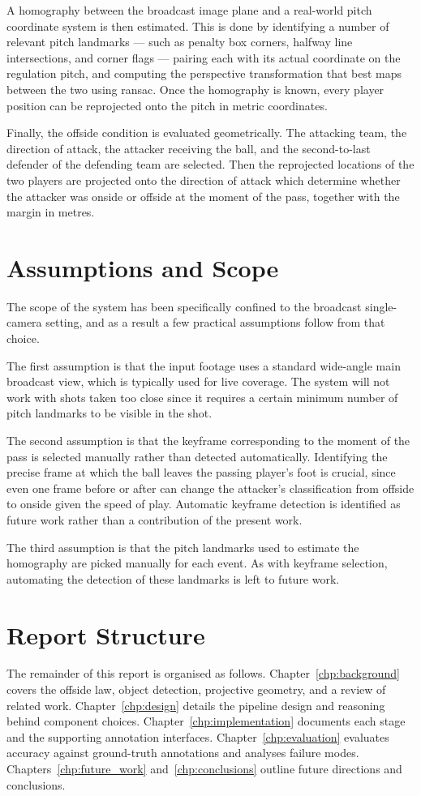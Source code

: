 A homography between the broadcast image plane and a real-world pitch coordinate system is then estimated. This is done by identifying a number of relevant pitch landmarks --- such as penalty box corners, halfway line intersections, and corner flags --- pairing each with its actual coordinate on the regulation pitch, and computing the perspective transformation that best maps between the two using \gls{ransac}. Once the homography is known, every player position can be reprojected onto the pitch in metric coordinates.

Finally, the offside condition is evaluated geometrically. The attacking team, the direction of attack, the attacker receiving the ball, and the second-to-last defender of the defending team are selected. Then the reprojected locations of the two players are projected onto the direction of attack which determine whether the attacker was onside or offside at the moment of the pass, together with the margin in metres.

\section{Assumptions and Scope}%
\label{sec:intro_scope}

The scope of the system has been specifically confined to the broadcast single-camera setting, and as a result a few practical assumptions follow from that choice.

The first assumption is that the input footage uses a standard wide-angle main broadcast view, which is typically used for live coverage. The system will not work with shots taken too close since it requires a certain minimum number of pitch landmarks to be visible in the shot.

The second assumption is that the keyframe corresponding to the moment of the pass is selected manually rather than detected automatically. Identifying the precise frame at which the ball leaves the passing player's foot is crucial, since even one frame before or after can change the attacker's classification from offside to onside given the speed of play. Automatic keyframe detection is identified as future work rather than a contribution of the present work.

The third assumption is that the pitch landmarks used to estimate the homography are picked manually for each event. As with keyframe selection, automating the detection of these landmarks is left to future work.

\section{Report Structure}%
\label{sec:intro_structure}

The remainder of this report is organised as follows. Chapter~\ref{chp:background} covers the offside law, object detection, projective geometry, and a review of related work. Chapter~\ref{chp:design} details the pipeline design and reasoning behind component choices. Chapter~\ref{chp:implementation} documents each stage and the supporting annotation interfaces. Chapter~\ref{chp:evaluation} evaluates accuracy against ground-truth annotations and analyses failure modes. Chapters~\ref{chp:future_work} and~\ref{chp:conclusions} outline future directions and conclusions.
